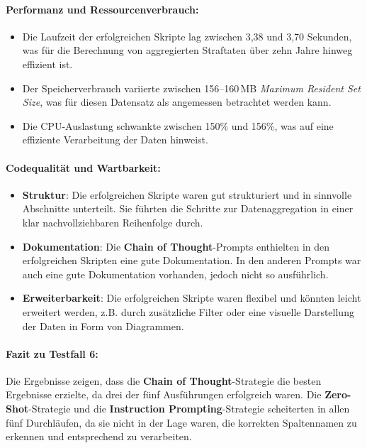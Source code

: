 \documentclass[11pt,a4paper]{article}
\begin{document}
\paragraph{Performanz und Ressourcenverbrauch:}
\begin{itemize}
    \item Die Laufzeit der erfolgreichen Skripte lag zwischen 3,38 und 3,70 Sekunden, was für die Berechnung von aggregierten Straftaten über zehn Jahre hinweg effizient ist.
    \item Der Speicherverbrauch variierte zwischen 156--160\,MB \emph{Maximum Resident Set Size}, was für diesen Datensatz als angemessen betrachtet werden kann.
    \item Die CPU-Auslastung schwankte zwischen 150\% und 156\%, was auf eine effiziente Verarbeitung der Daten hinweist.
\end{itemize}

\paragraph{Codequalität und Wartbarkeit:}
\begin{itemize}
    \item \textbf{Struktur}: Die erfolgreichen Skripte waren gut strukturiert und in sinnvolle Abschnitte unterteilt. Sie führten die Schritte zur Datenaggregation in einer klar nachvollziehbaren Reihenfolge durch.
    \item \textbf{Dokumentation}: Die \textbf{Chain of Thought}-Prompts enthielten in den erfolgreichen Skripten eine gute Dokumentation. In den anderen Prompts war auch eine gute Dokumentation vorhanden, jedoch nicht so ausführlich.
    \item \textbf{Erweiterbarkeit}: Die erfolgreichen Skripte waren flexibel und könnten leicht erweitert werden, z.B. durch zusätzliche Filter oder eine visuelle Darstellung der Daten in Form von Diagrammen.
\end{itemize}

\paragraph{Fazit zu Testfall 6:}
Die Ergebnisse zeigen, dass die \textbf{Chain of Thought}-Strategie die besten Ergebnisse erzielte, da drei der fünf Ausführungen erfolgreich waren. Die \textbf{Zero-Shot}-Strategie und die \textbf{Instruction Prompting}-Strategie scheiterten in allen fünf Durchläufen, da sie nicht in der Lage waren, die korrekten Spaltennamen zu erkennen und entsprechend zu verarbeiten.
\end{document}
